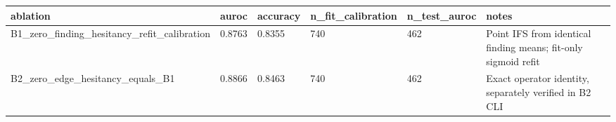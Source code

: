 \begin{tabular}{llllll}
\hline
ablation & auroc & accuracy & n\_fit\_calibration & n\_test\_auroc & notes \\
\hline
B1\_zero\_finding\_hesitancy\_refit\_calibration & 0.8763 & 0.8355 & 740 & 462 & Point IFS from identical finding means; fit-only sigmoid refit \\
B2\_zero\_edge\_hesitancy\_equals\_B1 & 0.8866 & 0.8463 & 740 & 462 & Exact operator identity, separately verified in B2 CLI \\
\hline
\end{tabular}
